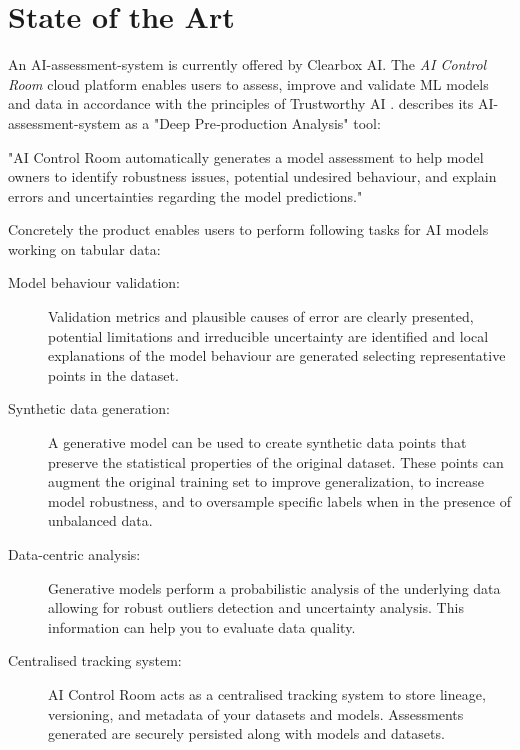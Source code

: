 \documentclass[11pt,a4paper,english]{scrreprt}
\begin{document}
\section{State of the Art}
An AI-assessment-system is currently offered by Clearbox AI. The \textit{AI Control Room} cloud platform enables users to assess, improve and validate ML models and data in accordance with the principles of Trustworthy AI \parencite{clearbox_website,eu_trustworthy_ai}. \textcite{clearbox_website} describes its AI-assessment-system as a "Deep Pre‑production Analysis" tool:
\begin{displayquote}
    "AI Control Room automatically generates a model assessment to help model owners to identify robustness issues, potential undesired behaviour, and explain errors and uncertainties regarding the model predictions."
\end{displayquote}

Concretely the product enables users to perform following tasks for AI models working on tabular data:
\begin{description}
    \item [Model behaviour validation:] Validation metrics and plausible causes of error are clearly presented, potential limitations and irreducible uncertainty are identified and local explanations of the model behaviour are generated selecting representative points in the dataset.
    \item [Synthetic data generation:] A generative model can be used to create synthetic data points that preserve the statistical properties of the original dataset. These points can augment the original training set to improve generalization, to increase model robustness, and to oversample specific labels when in the presence of unbalanced data.
    \item [Data-centric analysis:] Generative models perform a probabilistic analysis of the underlying data allowing for robust outliers detection and uncertainty analysis. This information can help you to evaluate data quality.
    \item [Centralised tracking system:] AI Control Room acts as a centralised tracking system to store lineage, versioning, and metadata of your datasets and models. Assessments generated are securely persisted along with models and datasets.
\end{description}
\end{document}

